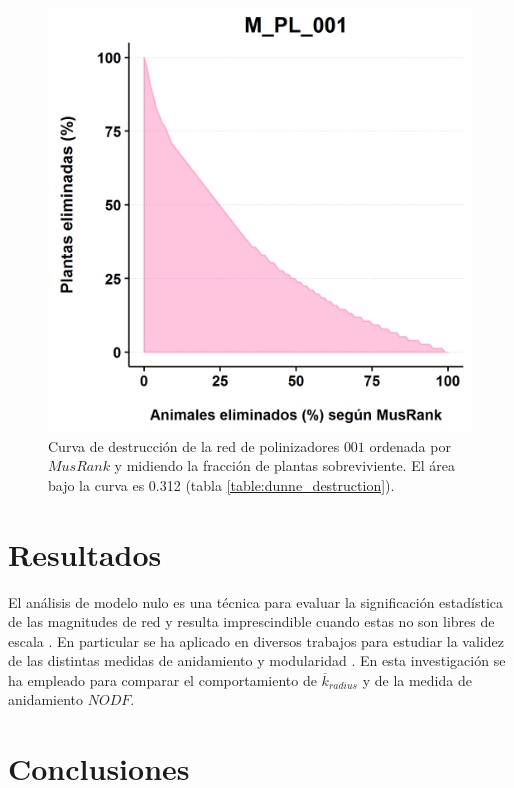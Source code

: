 \begin{figure}[h!]
\centering
\includegraphics[scale=0.8]{Figures/DEST_M_PL_001_MRdunne_extinction_plot.png}
\caption{Curva de destrucción de la red de polinizadores $001$ ordenada por $MusRank$ y midiendo la fracción de plantas sobreviviente. El área bajo la curva es 0.312 (tabla \ref{table:dunne_destruction}).}
\label{fig:DEST_M_PL_001_MRdunne_extinction_plot}
\end{figure}

\section{Resultados}
El análisis de modelo nulo es una técnica para evaluar la significación estadística de las magnitudes de red y resulta imprescindible cuando estas no son libres de escala \cite{gotelli1996null}. En particular se ha aplicado en diversos trabajos para estudiar la validez de las distintas medidas de anidamiento \cite{ulrich2013pattern, feng2014heterogeneity} y modularidad \cite{fortuna2010nestedness, mello2011modularity}. En esta investigación se ha empleado para comparar el comportamiento de $\overline {k}_{radius}$ y de la medida de anidamiento $NODF$.

\section{Conclusiones}

